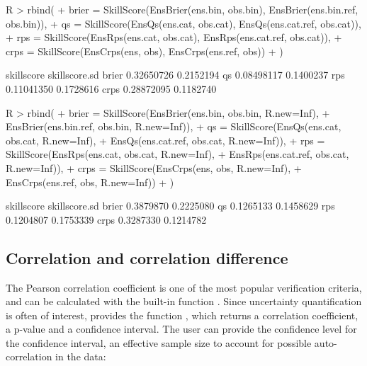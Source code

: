 \documentclass[article]{jss}
\begin{document}
\begin{Schunk}
\begin{Sinput}
R > rbind(
+   brier = SkillScore(EnsBrier(ens.bin, obs.bin), EnsBrier(ens.bin.ref, obs.bin)),
+   qs    = SkillScore(EnsQs(ens.cat, obs.cat),    EnsQs(ens.cat.ref, obs.cat)),
+   rps   = SkillScore(EnsRps(ens.cat, obs.cat),   EnsRps(ens.cat.ref, obs.cat)),
+   crps  = SkillScore(EnsCrps(ens, obs),          EnsCrps(ens.ref, obs))
+ )
\end{Sinput}
\begin{Soutput}
      skillscore skillscore.sd
brier 0.32650726     0.2152194
qs    0.08498117     0.1400237
rps   0.11041350     0.1728616
crps  0.28872095     0.1182740
\end{Soutput}
\end{Schunk}

\begin{Schunk}
\begin{Sinput}
R > rbind(
+   brier = SkillScore(EnsBrier(ens.bin, obs.bin, R.new=Inf), 
+                      EnsBrier(ens.bin.ref, obs.bin, R.new=Inf)),
+   qs    = SkillScore(EnsQs(ens.cat, obs.cat, R.new=Inf), 
+                      EnsQs(ens.cat.ref, obs.cat, R.new=Inf)),
+   rps   = SkillScore(EnsRps(ens.cat, obs.cat, R.new=Inf), 
+                      EnsRps(ens.cat.ref, obs.cat, R.new=Inf)),
+   crps  = SkillScore(EnsCrps(ens, obs, R.new=Inf), 
+                      EnsCrps(ens.ref, obs, R.new=Inf))
+ )
\end{Sinput}
\begin{Soutput}
      skillscore skillscore.sd
brier  0.3879870     0.2225080
qs     0.1265133     0.1458629
rps    0.1204807     0.1753339
crps   0.3287330     0.1214782
\end{Soutput}
\end{Schunk}


\subsection{Correlation and correlation difference}

The Pearson correlation coefficient is one of the most popular verification criteria, and can be calculated with the built-in  function .
Since uncertainty quantification is often of interest,  provides the function , which returns a correlation coefficient, a p-value and a confidence interval.
The user can provide the confidence level for the confidence interval, an effective sample size to account for possible auto-correlation in the data:
\end{document}
